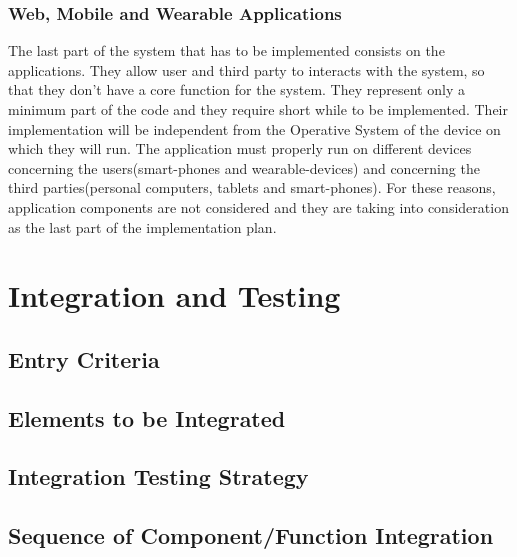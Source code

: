 \subsubsection{Web, Mobile and Wearable Applications}
The last part of the system that has to be implemented consists on the applications. They allow user and third party to interacts with the system, so that they don't have a core function for the system.
They represent only a minimum part of the code and they require short while to be implemented. 
Their implementation will be independent from the Operative System of the device on which they will run.
The application must properly run on different devices concerning the users(smart-phones and wearable-devices) and concerning the third parties(personal computers, tablets and smart-phones). 
For these reasons, application components are not considered  and they are taking into consideration as the last part of the implementation plan.

\clearpage
\section{Integration and Testing}
 \subsection{Entry Criteria}
\subsection{Elements to be Integrated}
\subsection{Integration Testing Strategy}
\subsection{Sequence of Component/Function Integration}